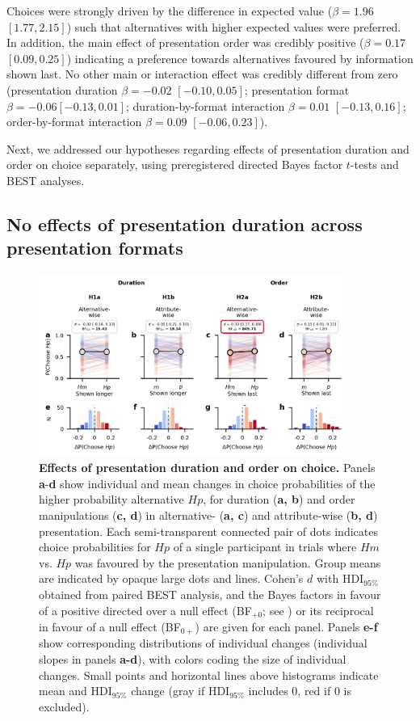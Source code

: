 \documentclass[11pt, a4paper, twocolumn, abstract]{scrartcl}
\begin{document}
Choices were strongly driven by the difference in expected value ($\beta = 1.96$ $[1.77, 2.15]$) such that alternatives with higher expected values were preferred. In addition, the main effect of presentation order was credibly positive ($\beta = 0.17$ $[0.09, 0.25]$) indicating a preference towards alternatives favoured by information shown last. No other main or interaction effect was credibly different from zero (presentation duration $\beta = -0.02$ $[-0.10, 0.05]$; presentation format $\beta = -0.06 [-0.13, 0.01]$; duration-by-format interaction $\beta = 0.01$ $[-0.13, 0.16]$; order-by-format interaction $\beta = 0.09$ $[-0.06, 0.23]$). 

Next, we addressed our hypotheses regarding effects of presentation duration and order on choice separately, using preregistered directed Bayes factor $t$-tests and BEST analyses.

\subsection*{No effects of presentation duration across presentation formats}

\begin{figure}[t]
    \centering
    \includegraphics[width=0.9\textwidth]{figures/choice_analyses_individual_changes.png}
    \caption{\textbf{Effects of presentation duration and order on choice.} Panels \textbf{a}-\textbf{d} show individual and mean changes in choice probabilities of the higher probability alternative $Hp$, for duration (\textbf{a, b}) and order manipulations (\textbf{c, d}) in alternative- (\textbf{a, c}) and attribute-wise (\textbf{b, d}) presentation. Each semi-transparent connected pair of dots indicates choice probabilities for $Hp$ of a single participant in trials where $Hm$ vs. $Hp$ was favoured by the presentation manipulation. Group means are indicated by opaque large dots and lines. Cohen's $d$ with HDI$_{95\%}$ obtained from paired BEST analysis, and the Bayes factors in favour of a positive directed over a null effect (BF$_{+0}$; see ) or its reciprocal in favour of a null effect (BF$_{0+}$) are given for each panel. Panels \textbf{e-f} show corresponding distributions of individual changes (individual slopes in panels \textbf{a-d}), with colors coding the size of individual changes. Small points and horizontal lines above histograms indicate mean and HDI$_{95\%}$ change (gray if HDI$_{95\%}$ includes 0, red if 0 is excluded).}
    \label{fig:choiceprobabilitychanges}
\end{figure}
\end{document}
